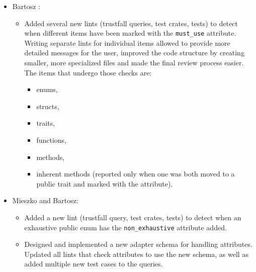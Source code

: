 \documentclass[licencjacka,en]{pracamgr}
\begin{document}
\begin{itemize}
	\item Bartosz \cite{responsibilities-bartosz}:
		\begin{itemize}



			\item Added several new lints (trustfall queries, test crates, tests) to detect
				when different items have been marked with the \texttt{must\_use} attribute.
				Writing separate lints for individual items allowed to provide more detailed
				messages for the user, improved the code structure by creating smaller,
				more specialized files and made the final review process easier. The items that
				undergo those checks are:
				\begin{itemize}
					\item enums,
					\item structs,
					\item traits,
					\item functions,
					\item methods,
					\item inherent methods (reported only when one was both moved to a public trait
						and marked with the attribute).
				\end{itemize}
		\end{itemize}

	\item Mieszko and Bartosz:
		\begin{itemize}
			\item Added a new lint (trustfall query, test crates, tests) to detect when
				an exhaustive public enum has the \texttt{non\_exhaustive} attribute added.
			\item Designed and implemented a new adapter schema for handling attributes.
				Updated all lints that check attributes to use the new schema, as well as added
				multiple new test cases to the queries.
		\end{itemize}
\end{itemize}
\end{document}
